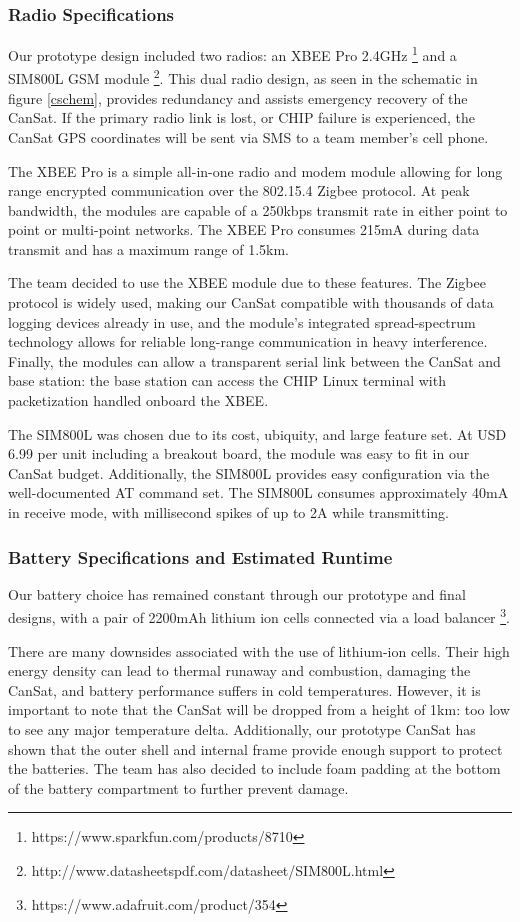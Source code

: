 \documentclass[]{report}
\begin{document}
 		\subsubsection{Radio Specifications}
 		Our prototype design included two radios: an XBEE Pro 2.4GHz \footnote{https://www.sparkfun.com/products/8710} and a SIM800L GSM module \footnote{http://www.datasheetspdf.com/datasheet/SIM800L.html}. This dual radio design, as seen in the schematic in figure \ref{cschem}, provides redundancy and assists emergency recovery of the CanSat. If the primary radio link is lost, or CHIP failure is experienced, the CanSat GPS coordinates will be sent via SMS to a team member's cell phone. 
 		
 		The XBEE Pro is a simple all-in-one radio and modem module allowing for long range encrypted communication over the 802.15.4 Zigbee protocol. At peak bandwidth, the modules are capable of a 250kbps transmit rate in either point to point or multi-point networks. The XBEE Pro consumes 215mA during data transmit and has a maximum range of 1.5km.
 		
 		The team decided to use the XBEE module due to these features. The Zigbee protocol is widely used, making our CanSat compatible with thousands of data logging devices already in use, and the module's integrated spread-spectrum technology allows for reliable long-range communication in heavy interference. Finally, the modules can allow a transparent serial link between the CanSat and base station: the base station can access the CHIP Linux terminal with packetization handled onboard the XBEE. 
 		
 		The SIM800L was chosen due to its cost, ubiquity, and large feature set. At USD 6.99 per unit including a breakout board, the module was easy to fit in our CanSat budget. Additionally, the SIM800L provides easy configuration via the well-documented AT command set. The SIM800L consumes approximately 40mA in receive mode, with millisecond spikes of up to 2A while transmitting.
 		\subsubsection{Battery Specifications and Estimated Runtime}
 		Our battery choice has remained constant through our prototype and final designs, with a pair of 2200mAh lithium ion cells connected via a load balancer \footnote{https://www.adafruit.com/product/354}.
 		
 		There are many downsides associated with the use of lithium-ion cells. Their high energy density can lead to thermal runaway and combustion, damaging the CanSat, and battery performance suffers in cold temperatures. However, it is important to note that the CanSat will be dropped from a height of 1km: too low to see any major temperature delta. Additionally, our prototype CanSat has shown that the outer shell and internal frame provide enough support to protect the batteries. The team has also decided to include foam padding at the bottom of the battery compartment to further prevent damage.
 		
\end{document}
